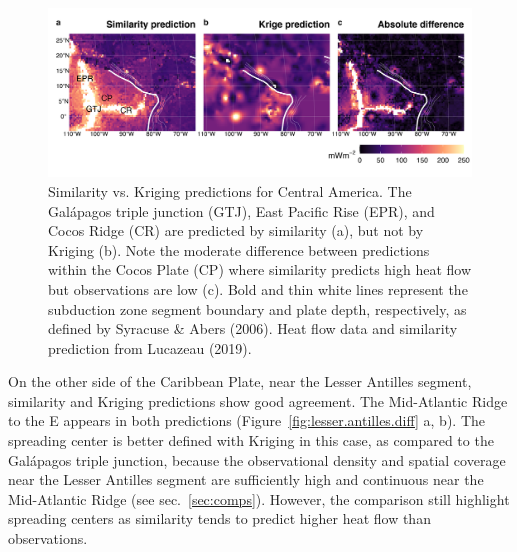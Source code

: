 \documentclass[draft,linenumbers]{agujournal2018}
\begin{document}
\begin{figure}[h]

{\centering \includegraphics[width=0.95\linewidth,]{../figs/diff/custom/Central_America} 

}

\caption{Similarity vs. Kriging predictions for Central America. The Galápagos triple junction (GTJ), East Pacific Rise (EPR), and Cocos Ridge (CR) are predicted by similarity (a), but not by Kriging (b). Note the moderate difference between predictions within the Cocos Plate (CP) where similarity predicts high heat flow but observations are low (c). Bold and thin white lines represent the subduction zone segment boundary and plate depth, respectively, as defined by Syracuse \& Abers (2006). Heat flow data and similarity prediction from Lucazeau (2019).}\label{fig:central.america.diff}
\end{figure}

On the other side of the Caribbean Plate, near the Lesser Antilles
segment, similarity and Kriging predictions show good agreement. The
Mid-Atlantic Ridge to the E appears in both predictions
(Figure~\ref{fig:lesser.antilles.diff} a, b). The spreading center is
better defined with Kriging in this case, as compared to the Galápagos
triple junction, because the observational density and spatial coverage
near the Lesser Antilles segment are sufficiently high and continuous
near the Mid-Atlantic Ridge (see sec.~\ref{sec:comps}). However, the
comparison still highlight spreading centers as similarity tends to
predict higher heat flow than observations.
\end{document}
